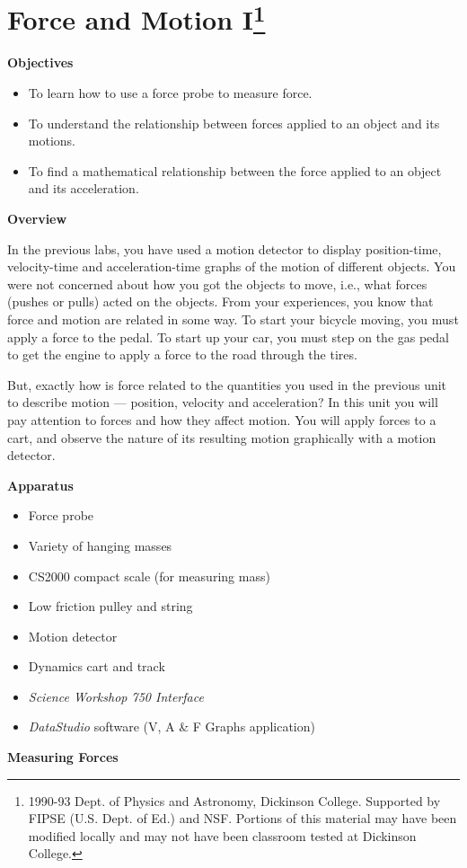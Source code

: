 
\section{Force and Motion I\footnote{
1990-93 Dept. of Physics and Astronomy, Dickinson College. Supported by FIPSE
(U.S. Dept. of Ed.) and NSF. Portions of this material may have been modified
locally and may not have been classroom tested at Dickinson College.
}}

\makelabheader %

\textbf{Objectives }

\begin{itemize}
\item To learn how to use a force probe to measure force. 
\item To understand the relationship between forces applied to an object and its motions. 
\item To find a mathematical relationship between the force applied to an object and its acceleration.
\end{itemize}
\textbf{Overview }

In the previous labs, you have used a motion detector to display position-time,
velocity-time and acceleration-time graphs of the motion of different objects.
You were not concerned about how you got the objects to move, i.e., what forces
(pushes or pulls) acted on the objects. From your experiences, you know that
force and motion are related in some way. To start your bicycle moving, you
must apply a force to the pedal. To start up your car, you must step on the
gas pedal to get the engine to apply a force to the road through the tires.

But, exactly how is force related to the quantities you used in the previous
unit to describe motion --- position, velocity and acceleration? In this unit you
will pay attention to forces and how they affect motion. You will apply forces
to a cart, and observe the nature of its resulting motion graphically with a
motion detector.

\textbf{Apparatus} 

\begin{itemize}
\item Force probe 
\item Variety of hanging masses 
\item CS2000 compact scale (for measuring mass)
\item Low friction pulley and string 
\item Motion detector 
\item Dynamics cart and track 
\item \textit{Science Workshop 750 Interface}
\item \textit{DataStudio} software (V, A \& F Graphs application)
\end{itemize}
\textbf{Measuring Forces} 

